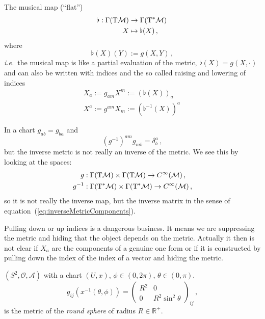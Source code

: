 \begin{defn}
    The musical map (``flat'')
    \begin{align}
        \label{eq:musicalMap}
        \flat: \Gamma(\T\M) &\to \Gamma(\T^*\M)\,\\ 
        X &\mapsto \flat(X)\,,
    \end{align}
    where
    \begin{equation}
        \flat(X)(Y):= g(X,Y)\,,
    \end{equation}
    \textit{i.e.}\ the musical map is like a partial evaluation
    of the metric, $\flat(X) = g(X,\cdot)$ and can also be written
    with indices and the so called raising and lowering of indices
    \begin{align}
        X_a := g_{am}X^m := \left( \flat(X) \right)_a\,\\
        X^a := g^{am}X_m := \left( \flat^{-1}(X) \right)^a\,
    \end{align}
\end{defn}

\begin{note}
    In a chart $g_{ab} = g_{ba}$ and
    \begin{equation}
        \left( g^{-1} \right)^{am} g_{mb} = \delta^a_b\,,
        \label{eq:inverseMetricComponents}
    \end{equation}
    but the inverse metric is not really an inverse of the metric.
    We see this by looking at the spaces:
    \begin{align}
        g&: \Gamma(\T\M)\times \Gamma(\T\M) \to C^\infty(\M)\,,\\
        g^{-1}&: \Gamma(\T^*\M)\times \Gamma(\T^*\M) \to C^\infty(\M)\,,
    \end{align}
    so it is not really the inverse map, but the inverse matrix in the sense
    of equation~(\ref{eq:inverseMetricComponents}).
\end{note}
\begin{note}
    Pulling down or up indices is a dangerous business.
    It means we are suppressing the metric and hiding
    that the object depends on the metric.
    Actually it then is not clear if $X_a$ are the
    components of a genuine one form or if it is
    constructed by pulling down the index of the index
    of a vector and hiding the metric.
\end{note}

\begin{example}[(Sphere)]
 $(S^2, \mathcal{O}, \mathcal{A})$
with a chart $(U,x)$, $\phi\in(0,2\pi)$, $\theta\in (0,\pi)$.
\begin{equation}
    g_{ij}\left(x^{-1}(\theta, \phi)\right) = 
    \begin{pmatrix}
        R^2 & 0 \\
        0 & R^2 \sin^2 \theta
    \end{pmatrix}_{ij}\,,
\end{equation}
is the metric of the \textit{round sphere} of radius $R\in\mathbb{R}^+$.
\end{example}

